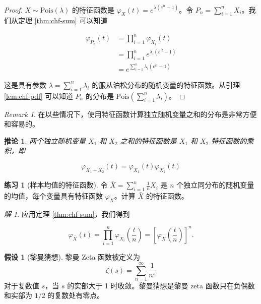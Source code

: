 \documentclass[
  12pt,
]{krantz}
\newtheorem{corollary}{推论}[chapter]
\theoremstyle{definition}
\theoremstyle{definition}
\theoremstyle{definition}
\newtheorem{exercise}{练习}[chapter]
\theoremstyle{definition}
\newtheorem{hypothesis}{假设}[chapter]
\theoremstyle{remark}
\newtheorem*{remark}{Remark}
\newtheorem*{solution}{解}
\begin{document}
\begin{proof}
\(X\sim\mathrm{Pois}(\lambda)\) 的特征函数是 \(\varphi _{X}(t)=e^{\lambda (e^{it}-1)}\)。令 \(P_n=\sum_{i=1}^nX_i\)。我们从定理 \ref{thm:chf-sum} 可以知道

\begin{equation*}
\begin{split}
\varphi _{P_{n}}(t) & =\prod_{i=1}^n\varphi _{X_i}(t) \\
& =\prod_{i=1}^n e^{\lambda_i (e^{it}-1)} \\
& = e^{\sum_{i=1}^n \lambda_i (e^{it}-1)}
\end{split}
\end{equation*}

这是具有参数 \(\lambda=\sum_{i=1}^n \lambda_i\) 的服从泊松分布的随机变量的特征函数。从引理 \ref{lem:chf-pdf} 可以知道 \(P_n\) 的分布是 \(\mathrm{Pois}(\sum_{i=1}^n\lambda_i)\)。
\end{proof}

\begin{remark}
在以些情况下，使用特征函数计算独立随机变量之和的分布是非常方便和容易的。
\end{remark}

\begin{corollary}
两个独立随机变量 \(X_1\) 和 \(X_2\) 之和的特征函数是 \(X_1\) 和 \(X_2\) 特征函数的乘积，即

\[\varphi _{X_1+X_2}(t)=\varphi _{X_1}(t) \varphi _{X_2}(t)\]
\end{corollary}

\begin{exercise}[样本均值的特征函数]
令 \(\bar{X}=\sum_{i=1}^n \frac{1}{n} X_i\) 是 \(n\) 个独立同分布的随机变量的均值，每个变量具有特征函数 \(\varphi _{X}\)。计算 \(\bar{X}\) 的特征函数。
\end{exercise}

\begin{solution}
应用定理 \ref{thm:chf-sum}，我们得到

\[\varphi _{\bar{X}}(t)=\prod_{i=1}^n \varphi _{X_i}\left(\frac{t}{n}\right)=\left[\varphi _{X}\left(\frac{t}{n}\right)\right]^n.\]
\end{solution}

\begin{hypothesis}[黎曼猜想]
黎曼 Zeta 函数被定义为
\[\zeta(s) = \sum_{n=1}^{\infty} \frac{1}{n^s}\]
对于复数值 \(s\)，当 \(s\) 的实部大于 1 时收敛。黎曼猜想是黎曼 zeta 函数只在负偶数和实部为 \(1/2\) 的复数处有零点。
\end{hypothesis}
\end{document}
